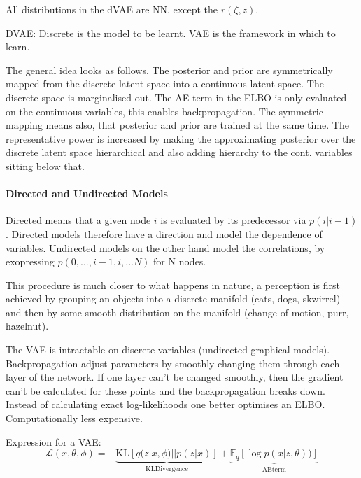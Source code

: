 All distributions in the dVAE are NN, except the $r(\zeta,z)$.

DVAE: Discrete is the model to be learnt. VAE is the framework in which to
learn.

The general idea looks as follows. The posterior and prior are symmetrically
mapped from the discrete latent space into a continuous latent space. The
discrete space is marginalised out. The AE term in the ELBO is only evaluated on
the continuous variables, this enables backpropagation. The symmetric mapping
means also, that posterior and prior are trained at the same time. The
representative power is increased by making the approximating posterior over the
discrete latent space hierarchical and also adding hierarchy to the cont.
variables sitting below that.

\paragraph{Directed and Undirected Models}
Directed means that a given node $i$ is evaluated by its predecessor via
$p(i|i-1)$. Directed models therefore have a direction and model the dependence
of variables. Undirected models on the other hand model the correlations, by
exopressing $p(0,...,i-1,i,...N)$ for N nodes.

This procedure is much closer to what happens in nature, a perception is first
achieved by grouping an objects into a discrete manifold (cats, dogs, skwirrel)
and then by some smooth distribution on the manifold (change of motion, purr,
hazelnut). 

The VAE is intractable on discrete variables (undirected graphical models).
Backpropagation adjust parameters by smoothly changing them through each layer
of the network. If one layer can't be changed smoothly, then the gradient can't
be calculated for these points and the backpropagation breaks down. Instead of
calculating exact log-likelihoods one better optimises an ELBO. Computationally
less expensive.

Expression for a VAE:
\[
  \mathcal{L}(x,\theta,\phi)=-\underbrace{\mathrm{KL}\left[q(z|x,\phi)||p(z|x)\right]}_{\mathrm{KL Divergence}}
  +\underbrace{\mathbb{E}_q\left[\log{p(x|z,\theta)})\right]}_{\mathrm{AE term}}
\]

